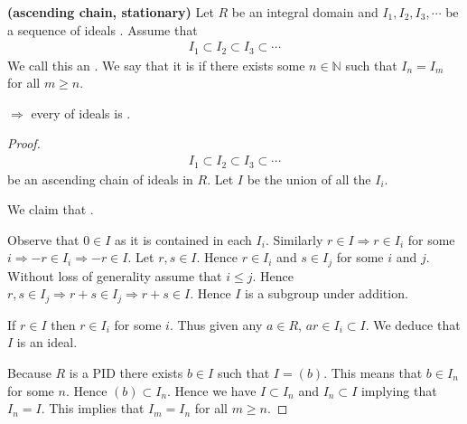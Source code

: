 \documentclass{article}
\newcommand{\bfs}[1]{\textbf{({#1}) }}
\begin{document}
\begin{defa}\bfs{ascending chain, stationary}
Let $R$ be an integral domain and $I_{1}, I_{2}, I_{3}, \cdots$ be a sequence of ideals . Assume that
\begin{align*}
I_{1} \subset I_{2} \subset I_{3} \subset \cdots
\end{align*}
We call this an . We say that it is  if there exists some $n \in \mathbb{N}$ such that $I_{n}=I_{m}$ for all $m \geq n$.
\end{defa} 
\begin{thma}
 $\Rightarrow$ every  of ideals is .
\end{thma} 
\begin{proof}
\begin{align*}
I_{1} \subset I_{2} \subset I_{3} \subset \cdots
\end{align*}
be an ascending chain of ideals in $R$. Let $I$ be the union of all the $I_{i}$. 

We claim that .

Observe that $0 \in I$ as it is contained in each $I_{i}$. Similarly $r \in I \Rightarrow r \in I_{i}$ for some $i \Rightarrow-r \in I_{i} \Rightarrow-r \in I$. Let $r, s \in I$. Hence $r \in I_{i}$ and $s \in I_{j}$ for some $i$ and $j$. Without loss of generality assume that $i \leq j$. Hence $r, s \in I_{j} \Rightarrow r+s \in I_{j} \Rightarrow r+s \in I$. Hence $I$ is a subgroup under addition.

If $r \in I$ then $r \in I_{i}$ for some $i$. Thus given any $a \in R$, $ar\in I_{i} \subset I$. We deduce that $I$ is an ideal.

Because $R$ is a PID there exists $b \in I$ such that $I=(b)$. This means that $b \in I_{n}$ for some $n$. Hence $(b) \subset I_{n}$. Hence we have $I \subset I_{n}$ and $I_{n} \subset I$ implying that $I_{n}=I$. This implies that $I_{m}=I_{n}$ for all $m \geq n$.
\end{proof}
\end{document}

